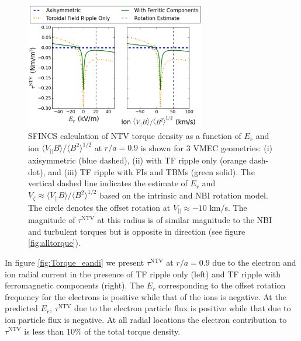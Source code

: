 \documentclass[aip, pop, preprint]{revtex4-1}
\numberwithin{figure}{section}
\numberwithin{equation}{section}
\begin{document}
\FloatBarrier

\begin{figure}[h!]
\centering
\includegraphics[width=0.7\textwidth]{figure6.eps}
\caption{\label{fig:Torque_ErandV} SFINCS calculation of NTV torque density as a function of $E_r$ and ion $\langle V_{||} B \rangle/\langle B^2 \rangle^{1/2}$ at $r/a = 0.9$ is shown for 3 VMEC geometries: (i) axisymmetric (blue dashed), (ii) with TF ripple only (orange dash-dot), and (iii) TF ripple with FIs and TBMs (green solid). The vertical dashed line indicates the estimate of $E_r$ and $V_{\zeta} \approx \langle V_{||} B \rangle/\langle B^2 \rangle^{1/2}$ based on the intrinsic and NBI rotation model. The circle denotes the offset rotation at $V_{||} \approx -10$ km/s. The magnitude of $\tau^{\mathrm{NTV}}$ at this radius is of similar magnitude to the NBI and turbulent torques but is opposite in direction (see figure \ref{fig:alltorque}).}
\end{figure}

In figure \ref{fig:Torque_eandi} we present $\tau^{\mathrm{NTV}}$ at $r/a = 0.9$ due to the electron and ion radial current in the presence of TF ripple only (left) and TF ripple with ferromagnetic components (right). The $E_r$ corresponding to the offset rotation frequency for the electrons is positive while that of the ions is negative. At the predicted $E_r$, $\tau^{\mathrm{NTV}}$ due to the electron particle flux is positive while that due to ion particle flux is negative. At all radial locations the electron contribution to $\tau^{\mathrm{NTV}}$ is less than 10\% of the total torque density. 
\end{document}
